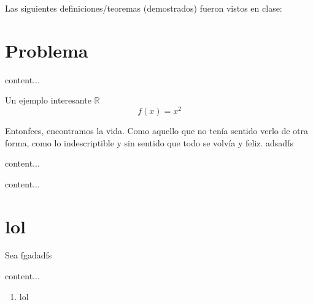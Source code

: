 




Las siguientes definiciones/teoremas (demostrados) fueron vistos en clase: 
\section{Problema}
\begin{problema}
	content...
\end{problema}
\begin{problema}[nice] Un ejemplo interesante $\mathbb{R}$
	$$f(x)=x^2$$
\end{problema}

\begin{dem}
	Entonfces, encontramos la vida. Como aquello que no tenía sentido verlo de otra forma, como lo indescriptible y sin sentido que todo se volvía y feliz. adsadfs
\end{dem}
\begin{sol}
	content...
\end{sol}

\begin{definicion}
	content...
\end{definicion}
\section{lol}



\begin{cajita}
	\begin{teorema}
		Sea fgadadfs
	\end{teorema}
\end{cajita}
\begin{cajita}
	\begin{definicion}
		content...
	\end{definicion}
\end{cajita}

\begin{enumerate}
	\item lol \cite{carothers2000real}
\end{enumerate}

\newpage





